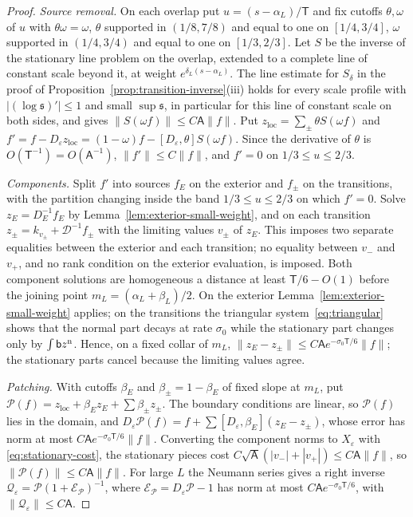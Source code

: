\documentclass[11pt]{amsart}
\theoremstyle{definition}
\theoremstyle{remark}
\theoremstyle{plain}
\numberwithin{equation}{section}
\newcommand{\eps}{\varepsilon}
\begin{document}
\begin{proof}
\emph{Source removal.} On each overlap put $u=(s-\alpha_L)/\mathsf T$ and fix cutoffs
$\theta,\omega$ of $u$ with $\theta\omega=\omega$, $\theta$ supported in $(1/8,7/8)$ and
equal to one on $[1/4,3/4]$, $\omega$ supported in $(1/4,3/4)$ and equal to one on
$[1/3,2/3]$. Let $S$ be the inverse of the stationary line problem on the
overlap, extended to a complete line of constant scale beyond it, at weight
$e^{\delta_L(s-\alpha_L)}$. The line estimate for $S_\delta$ in the proof of
Proposition~\ref{prop:transition-inverse}(iii) holds for every scale profile with
$|(\log{\mathfrak s})'|\le1$ and small $\sup{\mathfrak s}$, in particular for this line of
constant scale on both sides, and gives $\|S(\omega f)\|\le C\mathsf A\|f\|$. Put $z_{\mathrm{loc}}=\sum_\pm\theta S(\omega f)$ and
$f'=f-D_\eps z_{\mathrm{loc}}=(1-\omega)f-[D_\eps,\theta]S(\omega f)$. Since the
derivative of $\theta$ is $O(\mathsf T^{-1})=O(\mathsf A^{-1})$, $\|f'\|\le C\|f\|$, and $f'=0$ on
$1/3\le u\le2/3$.

\emph{Components.} Split $f'$ into sources $f_E$ on the exterior and $f_\pm$ on
the transitions, with the partition changing inside the band $1/3\le u\le2/3$ on which $f'=0$. Solve
$z_E=D_E^{-1}f_E$ by Lemma~\ref{lem:exterior-small-weight}, and on each
transition $z_\pm=k_{v_\pm}+\mathcal D^{-1}f_\pm$ with the limiting values $v_\pm$ of $z_E$.
This imposes two separate equalities between the exterior and each transition;
no equality between $v_-$ and $v_+$, and no rank condition on the exterior
evaluation, is imposed. Both component solutions are homogeneous a distance at
least $\mathsf T/6-O(1)$ before the joining point $m_L=(\alpha_L+\beta_L)/2$. On the
exterior Lemma~\ref{lem:exterior-small-weight} applies; on the transitions the
triangular system~\eqref{eq:triangular} shows that the normal part decays at rate
$\sigma_0$ while the stationary part changes only by $\int\mathsf bz^{\rm n}$. Hence,
on a fixed collar of $m_L$,
$\|z_E-z_\pm\|\le C\mathsf Ae^{-\sigma_0\mathsf T/6}\|f\|$; the stationary parts cancel because
the limiting values agree.

\emph{Patching.} With cutoffs $\beta_E$ and $\beta_\pm=1-\beta_E$ of fixed slope at
$m_L$, put $\mathcal P(f)=z_{\mathrm{loc}}+\beta_Ez_E+\sum\beta_\pm z_\pm$. The boundary
conditions are linear, so $\mathcal P(f)$ lies in the domain, and
$D_\eps\mathcal P(f)=f+\sum[D_\eps,\beta_E](z_E-z_\pm)$, whose error has norm at most
$C\mathsf Ae^{-\sigma_0\mathsf T/6}\|f\|$. Converting the component norms to $X_\eps$ with
\eqref{eq:stationary-cost}, the stationary pieces cost $C\sqrt{\mathsf A}(|v_-|+|v_+|)\le
C\mathsf A\|f\|$, so $\|\mathcal P(f)\|\le C\mathsf A\|f\|$. For large $L$ the Neumann series gives a
right inverse $\mathcal Q_\eps=\mathcal P(1+\mathcal E_{\mathcal P})^{-1}$, where
$\mathcal E_{\mathcal P}=D_\eps\mathcal P-1$ has norm at most $C\mathsf Ae^{-\sigma_0\mathsf T/6}$, with
$\|\mathcal Q_\eps\|\le C\mathsf A$.


\end{proof}
\end{document}
